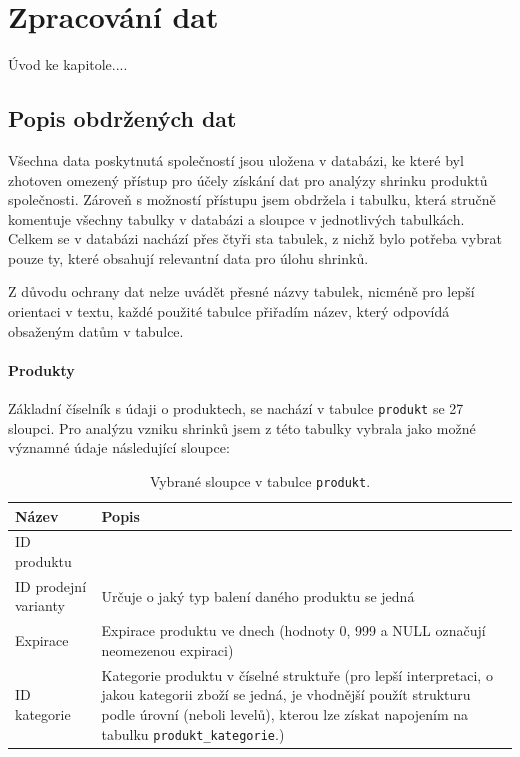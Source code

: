 \chapter{Zpracování dat}

Úvod ke kapitole.... %

\section{Popis obdržených dat}

Všechna data poskytnutá společností jsou uložena v databázi, ke které byl zhotoven omezený přístup pro účely získání dat pro analýzy shrinku produktů společnosti. Zároveň s možností přístupu jsem obdržela i tabulku, která stručně komentuje všechny tabulky v databázi a sloupce v jednotlivých tabulkách. Celkem se v databázi nachází přes čtyři sta tabulek, z nichž bylo potřeba vybrat pouze ty, které obsahují relevantní data pro úlohu shrinků.

Z důvodu ochrany dat nelze uvádět přesné názvy tabulek, nicméně pro lepší orientaci v textu, každé použité tabulce přiřadím název, který odpovídá obsaženým datům v tabulce.

\subsubsection{Produkty}

Základní číselník s údaji o produktech, se nachází v tabulce \texttt{produkt} se 27 sloupci. Pro analýzu vzniku shrinků jsem z této tabulky vybrala jako možné významné údaje následující sloupce:

\begin{table}[hbtp!]
    \captionsetup{justification=centering}
    \begin{center}
    \caption{Vybrané sloupce v tabulce \texttt{produkt}.}
    \label{tab:d:4Bzast}
    \begin{tabular}{l l}
        Název & Popis \\
        \hline
        ID produktu &  \\
        ID prodejní varianty & Určuje o jaký typ balení daného produktu se jedná  \\   
        Expirace & Expirace produktu ve dnech (hodnoty 0, 999 a NULL označují neomezenou expiraci) \\   
        ID kategorie & Kategorie produktu v číselné struktuře (pro lepší interpretaci, o jakou kategorii zboží se jedná, je vhodnější použít strukturu podle úrovní (neboli levelů), kterou lze získat napojením na tabulku \texttt{produkt\_kategorie}.)
    \end{tabular}
    \end{center}
\end{table}

